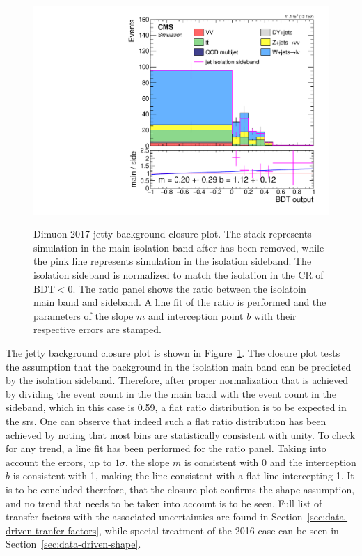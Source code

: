 \begin{figure}[!htb]
\centering
\includegraphics[width=0.60\linewidth]{plots/dilepton_muons_2017_closure/none_closure_dilepBDTphase1CorrJetNoMultIso10Dr0.6.pdf}  \\


\caption[Dimuon 2017 jetty background closure plot]{Dimuon 2017 jetty background closure plot. The stack represents simulation in the main isolation band after \ztautau has been removed, while the pink line represents simulation in the isolation sideband. The isolation sideband is normalized to match the isolation in the CR of $\mathrm{BDT} < 0$. The ratio panel shows the ratio between the isolatoin main band and sideband. A line fit of the ratio is performed and the parameters of the slope $m$ and interception point $b$ with their respective errors are stamped.}
\label{fig:dimuon-bdt-jetty-2017-closure}
\end{figure}

The jetty background closure plot is shown in Figure~\ref{fig:dimuon-bdt-jetty-2017-closure}. The closure plot tests the assumption that the background in the isolation main band can be predicted by the isolation sideband. Therefore, after proper normalization that is achieved by dividing the event count in the the main band with the event count in the sideband, which in this case is 0.59, a flat ratio distribution is to be expected in the \glspl{sr}. One can observe that indeed such a flat ratio distribution has been achieved by noting that most bins are statistically consistent with unity. To check for any trend, a line fit has been performed for the ratio panel. Taking into account the errors, up to $1\sigma$, the slope $m$ is consistent with 0 and the interception $b$ is consistent with 1, making the line consistent with a flat line intercepting 1. It is to be concluded therefore, that the closure plot confirms the shape assumption, and no trend that needs to be taken into account is to be seen. Full list of transfer factors with the associated uncertainties are found in Section~\ref{sec:data-driven-tranfer-factors}, while special treatment of the 2016 case can be seen in Section~\ref{sec:data-driven-shape}.

